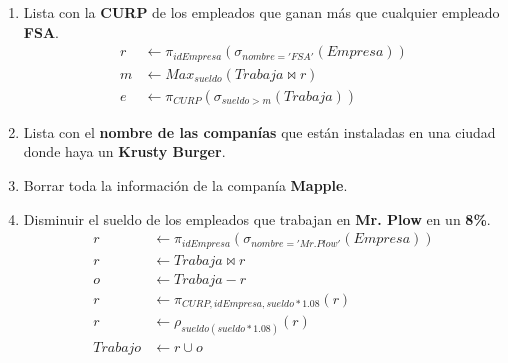 \documentclass{article}
\begin{document}
\begin{enumerate}
{{\begin{enumerate}
{\begin{align*}
                            p &\leftarrow \pi_{idEmpresa}(\sigma_{nombre = 'FSA'}(Empresa)) \\
                            p &\leftarrow \pi_{CURP}(Trabaja \bowtie p) \\
                            r &\leftarrow r - p \\
                            r &\leftarrow pi_{nombre}(r \bowtie Empleado)
                        \end{align*}
                    }
                    \item {
                        Lista con la \textbf{CURP} de los empleados que ganan
                        más que cualquier empleado \textbf{FSA}.
                        \begin{align*}
                            r &\leftarrow \pi_{idEmpresa}(\sigma_{nombre = 'FSA'}(Empresa)) \\
                            m &\leftarrow Max_{sueldo}(Trabaja \bowtie r) \\
                            e &\leftarrow \pi_{CURP}(\sigma_{sueldo>m}(Trabaja))
                        \end{align*}
                    }
                    \item {
                        Lista con el \textbf{nombre de las companías} que están
                        instaladas en una ciudad donde haya un
                        \textbf{Krusty Burger}.
                    }
                    \item {
                        Borrar toda la información de la companía
                        \textbf{Mapple}.
                    }
                    \item {
                        Disminuir el sueldo de los empleados que trabajan en
                        \textbf{Mr. Plow} en un \textbf{8\%}.
                        \begin{align*}
                            r &\leftarrow \pi_{idEmpresa}(\sigma_{nombre = 'Mr. Plow'}(Empresa)) \\
                            r &\leftarrow Trabaja \bowtie r \\
                            o &\leftarrow Trabaja - r \\
                            r &\leftarrow \pi_{CURP, idEmpresa, sueldo*1.08}(r)\\
                            r &\leftarrow \rho_{sueldo(sueldo*1.08)}(r)\\
                            Trabajo &\leftarrow r \cup o

\end{align*}}
\end{enumerate}}}
\end{enumerate}
\end{document}
